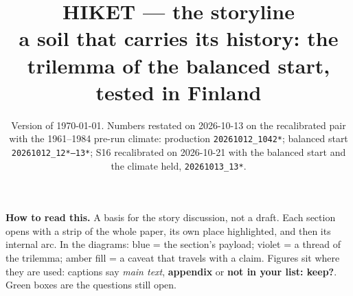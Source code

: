 \documentclass[11pt]{article}
\title{\vspace{-1.4cm}\textbf{HIKET --- the storyline}\\[2pt]
\large a soil that carries its history: the trilemma of the balanced start, tested in Finland}
\author{}
\date{\small Version of \today. Numbers restated on 2026-10-13 on the recalibrated pair with the 1961--1984
pre-run climate: production \texttt{20261012\_1042*}; balanced start \texttt{20261012\_12*--13*}; S16 recalibrated on 2026-10-21
with the balanced start and the climate held, \texttt{20261013\_13*}.}
\begin{document}
\maketitle

\begin{note}
\textbf{How to read this.} A basis for the story discussion, not a draft. Each section opens with a strip
of the whole paper, its own place highlighted, and then its internal arc. In the diagrams: blue = the
section's payload; violet = a thread of the trilemma; amber fill = a caveat that travels with a claim.
Figures sit where they are used: captions say \emph{main text}, \textcolor{warnrule}{\textbf{appendix}} or
\textcolor{lorrule}{\textbf{not in your list: keep?}}. Green boxes are the questions still open.
\end{note}
\end{document}
